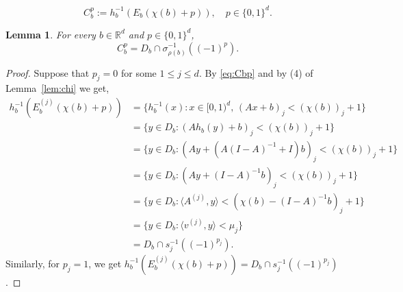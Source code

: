 \documentclass[10pt,a4paper]{amsart}
\newtheorem{lemma}{Lemma}
\newcommand{\Rr}{\mathbb{R}}
\begin{document}
\begin{equation}\label{eq:Cbp}
C_b^p:=h_b^{-1}(E_b(\chi(b)+p)),\quad p\in\{0,1\}^d.
\end{equation}

\begin{lemma}\label{lem:Cbp}For every $b\in\Rr^d$ and $p\in\{0,1\}^d$,
$$C_b^p = D_b\cap \sigma^{-1}_{\rho(b)}((-1)^p).$$
\end{lemma}

\begin{proof}
Suppose that ${p_j}=0$ for some ${1\le j\le d}$. By \eqref{eq:Cbp} and by (4) of Lemma~\ref{lem:chi} we get,
\begin{align*}
h_b^{-1}(E_b^{{(j)}}(\chi(b)+p))&=\{h_b^{-1}(x)\colon x\in[0,1)^d,\, (Ax+b)_{{j}}<(\chi(b))_{{j}}+1\}\\
&= \{y\in D_b\colon (Ah_b(y)+b)_{{j}}<(\chi(b))_{{j}}+1\}\\
&= \{y\in D_b\colon (Ay+(A(I-A)^{-1}+I)b)_{{j}}<(\chi(b))_{{j}}+1\}\\
&= \{y\in D_b\colon (Ay+(I-A)^{-1}b)_{{j}}<(\chi(b))_{{j}}+1\}\\
&= \{y\in D_b\colon \langle A^{{(j)}},y\rangle <(\chi(b)-(I-A)^{-1}b)_{{j}}+1\}\\
&= \{y\in D_b\colon \langle v^{{(j)}},y\rangle <\mu_{{j}}\}\\
&= D_b\cap s_{{j}}^{-1}((-1)^{p_{{j}}}).
\end{align*}
Similarly, for $p_{{j}}=1$, we get $h_b^{-1}(E_b^{{(j)}}(\chi(b)+p)) = D_b\cap s_{{j}}^{-1}((-1)^{p_{{j}}})$.

\end{proof}
\end{document}
